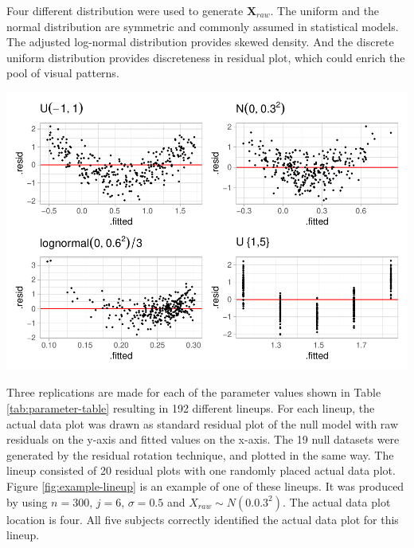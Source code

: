 \documentclass[]{interact}
\theoremstyle{plain}%
\theoremstyle{definition}
\theoremstyle{remark}
\begin{document}
Four different distribution were used to generate
\(\boldsymbol{X}_{raw}\). The uniform and the normal distribution are
symmetric and commonly assumed in statistical models. The adjusted
log-normal distribution provides skewed density. And the discrete
uniform distribution provides discreteness in residual plot, which could
enrich the pool of visual patterns.

\includegraphics{paper_comparison_files/figure-latex/different-dist-1.pdf}

Three replications are made for each of the parameter values shown in
Table \ref{tab:parameter-table} resulting in 192 different lineups. For
each lineup, the actual data plot was drawn as standard residual plot of
the null model with raw residuals on the y-axis and fitted values on the
x-axis. The 19 null datasets were generated by the residual rotation
technique, and plotted in the same way. The lineup consisted of 20
residual plots with one randomly placed actual data plot. Figure
\ref{fig:example-lineup} is an example of one of these lineups. It was
produced by using \(n = 300\), \(j = 6\), \(\sigma = 0.5\) and
\(X_{raw} \sim N(0.0.3^2)\). The actual data plot location is four. All
five subjects correctly identified the actual data plot for this lineup.
\end{document}
